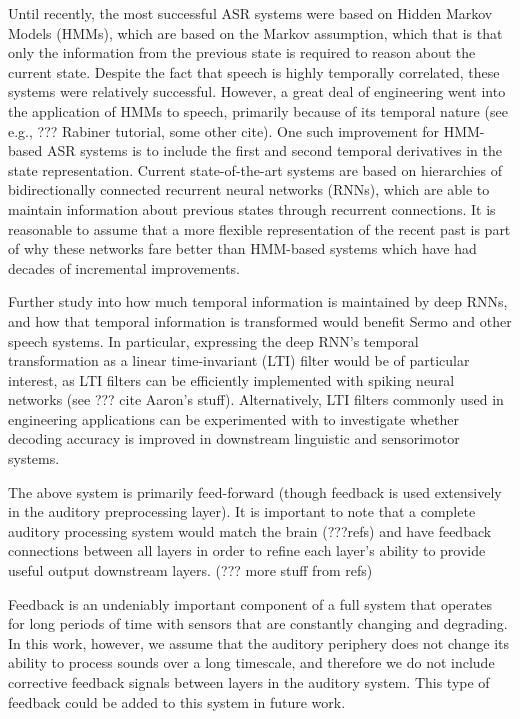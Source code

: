 Until recently,
the most successful ASR systems
were based on Hidden Markov Models (HMMs),
which are based on the Markov assumption,
which that is that only the information
from the previous state is required
to reason about the current state.
Despite the fact that speech is highly temporally correlated,
these systems were relatively successful.
However, a great deal of engineering
went into the application of HMMs
to speech, primarily because of
its temporal nature
(see e.g., ??? Rabiner tutorial,
some other cite).
One such improvement for HMM-based ASR systems
is to include the first and second temporal derivatives
in the state representation.
Current state-of-the-art systems
are based on hierarchies of bidirectionally connected
recurrent neural networks (RNNs),
which are able to maintain information about
previous states through recurrent connections.
It is reasonable to assume that
a more flexible representation
of the recent past
is part of why these networks
fare better than HMM-based systems
which have had decades of incremental improvements.

Further study into how much temporal information
is maintained by deep RNNs,
and how that temporal information is transformed
would benefit Sermo
and other speech systems.
In particular, expressing the deep RNN's
temporal transformation as a
linear time-invariant (LTI) filter
would be of particular interest,
as LTI filters can be efficiently implemented
with spiking neural networks
(see ??? cite Aaron's stuff).
Alternatively, LTI filters
commonly used in engineering applications
can be experimented with
to investigate whether decoding accuracy
is improved in downstream
linguistic and sensorimotor systems.

The above system is primarily feed-forward
(though feedback is used extensively in the
auditory preprocessing layer).
It is important to note that
a complete auditory processing system
would match the brain (???refs) and have
feedback connections between all layers
in order to refine each layer's ability
to provide useful output downstream layers.
(??? more stuff from refs)

Feedback is an undeniably important
component of a full system that operates
for long periods of time with sensors
that are constantly changing and degrading.
In this work, however, we assume
that the auditory periphery does not change
its ability to process sounds over a long timescale,
and therefore we do not include corrective feedback
signals between layers in the auditory system.
This type of feedback could be added
to this system in future work.


